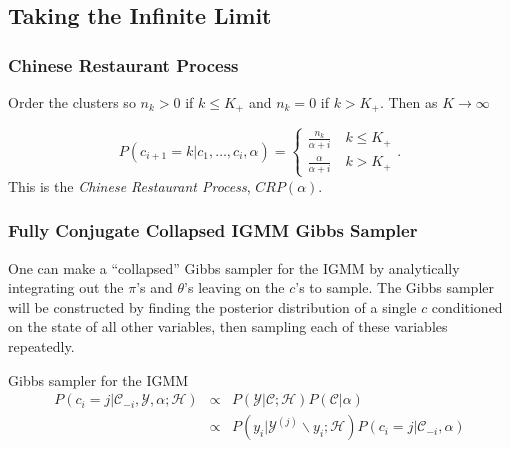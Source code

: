 \documentclass{beamer}
\begin{document}
\subsection{Taking the Infinite Limit}

\begin{frame}[t]
\frametitle{Chinese Restaurant Process}

Order the clusters so $n_k > 0$ if $k \le K_+$ and $n_k = 0$ if $k > K_+$.  Then as $K\rightarrow\infty$

\begin{equation*}
P(c_{i+1} = k | c_1,\ldots,c_{i},\alpha) = 
\left\{ \begin{array}{l} 
       \frac{n_k}{\alpha+i} \quad k \leq K_+\\ 
	\frac{\alpha}{\alpha+i} \quad k>K_+ \end{array} \right..
\label{eqn:crp}
\end{equation*}
This is the {\em Chinese Restaurant Process}, $CRP(\alpha)$.
\end{frame}


\begin{frame}[t]
\frametitle{Fully Conjugate Collapsed IGMM Gibbs Sampler}
One can make a ``collapsed'' Gibbs sampler for the IGMM by analytically integrating out the $\pi$'s and $\theta$'s leaving on the $c$'s to sample.  The Gibbs sampler will be constructed by finding the posterior distribution of a single $c$ conditioned on the state of all other variables, then sampling each of these variables repeatedly.
\begin{block}{Gibbs sampler for the IGMM}
\begin{eqnarray}
P(c_i = j | \mathcal{C}_{-i}, \mathcal{Y}, \alpha; \mathcal{H}) &\propto& P(\mathcal{Y} | \mathcal{C}; \mathcal{H}) P(\mathcal{C}|\alpha) \nonumber \\
&\propto& P(y_i | \mathcal{Y}^{(j)} \backslash y_i; \mathcal{H}) P(c_i = j |  \mathcal{C}_{-i}, \alpha) \nonumber
\label{eqn:clpsed_gibbs_cid_conditional}
\end{eqnarray}
\end{block}
\end{frame}
\end{document}
